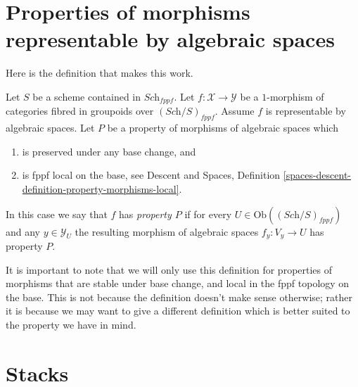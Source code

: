 \section{Properties of morphisms representable by algebraic spaces}
\label{section-representable-properties}

\noindent
Here is the definition that makes this work.

\begin{definition}
\label{definition-relative-representable-property}
Let $S$ be a scheme contained in $\textit{Sch}_{fppf}$.
Let $f : \mathcal{X} \to \mathcal{Y}$ be a $1$-morphism
of categories fibred in groupoids over $(\textit{Sch}/S)_{fppf}$.
Assume $f$ is representable by algebraic spaces.
Let $P$ be a property of morphisms of algebraic spaces which
\begin{enumerate}
\item is preserved under any base change, and
\item is fppf local on the base, see
Descent and Spaces,
Definition \ref{spaces-descent-definition-property-morphisms-local}.
\end{enumerate}
In this case we say that $f$ has {\it property $P$} if for every
$U \in \text{Ob}((\textit{Sch}/S)_{fppf})$ and
any $y \in \mathcal{Y}_U$ the resulting morphism of algebraic spaces
$f_y : V_y \to U$ has property $P$.
\end{definition}

\noindent
It is important to note that we will only use this definition for
properties of morphisms that are stable under base change, and
local in the fppf topology on the base. This is
not because the definition doesn't make sense otherwise; rather it
is because we may want to give a different definition which is
better suited to the property we have in mind.

















\section{Stacks}
\label{section-stacks}

